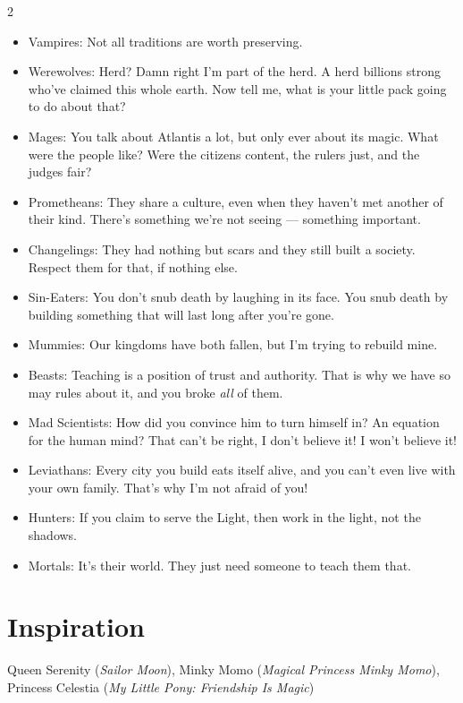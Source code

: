 \begin{multicols}{2}
\begin{itemize}
\item Vampires: Not all traditions are worth preserving.
\item Werewolves: Herd? Damn right I'm part of the herd. A herd billions strong who've claimed this whole earth. Now tell me, what is your little pack going to do about that?
\item Mages: You talk about Atlantis a lot, but only ever about its magic. What were the people like? Were the citizens content, the rulers just, and the judges fair?
\item Prometheans: They share a culture, even when they haven't met another of their kind. There's something we're not seeing — something important.
\item Changelings: They had nothing but scars and they still built a society. Respect them for that, if nothing else.
\item Sin-Eaters: You don't snub death by laughing in its face. You snub death by building something that will last long after you're gone.
\item Mummies: Our kingdoms have both fallen, but I'm trying to rebuild mine. 
\item Beasts: Teaching is a position of trust and authority. That is why we have so may rules about it, and you broke \textit{all} of them.
\item Mad Scientists: How did you convince him to turn himself in? An equation for the human mind? That can't be right, I don't believe it! I won't believe it!
\item Leviathans: Every city you build eats itself alive, and you can't even live with your own family. That's why I'm not afraid of you!

\item Hunters: If you claim to serve the Light, then work in the light, not the shadows.
\item Mortals: It's their world. They just need someone to teach them that.
\end{itemize}

\section*{Inspiration}
Queen Serenity (\textit{Sailor Moon}), Minky Momo (\textit{Magical Princess Minky Momo}), Princess Celestia (\textit{My Little Pony: Friendship Is Magic})

\end{multicols}
